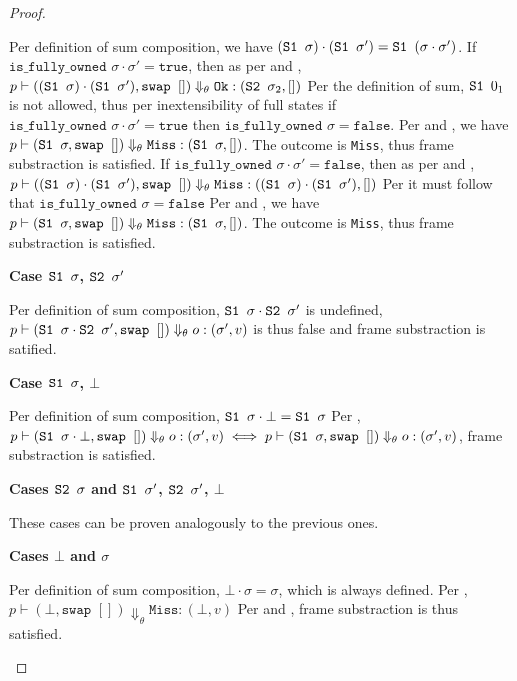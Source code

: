 \documentclass[,a4paper,oneside]{article}
\newcommand{\code}[1]{\texttt{#1}}
\newcommand{\st}[0]{\sigma}
\newcommand{\evalsto}[3]{\ensuremath{p\vdash(#1)\Downarrow_\theta#2:(#3)}}
\newcommand{\Ok}[0]{\code{Ok}}
\newcommand{\Miss}[0]{\code{Miss}}
\begin{document}
\begin{proof}
\begin{description}
	 Per definition of sum composition, we have $(\sone\st)\cdot(\sone\st') = \sone(\st\cdot\st')$.
	 If $\code{is\_fully\_owned } \st\cdot\st' = \code{true}$, then as per  and , ${\evalsto{(\sone\st)\cdot(\sone\st'), \code{swap }[]}{\Ok}{\stwo\st_2,[]}}$
	 Per the definition of sum, $\sone0_1$ is not allowed, thus per inextensibility of full states if ${\code{is\_fully\_owned }\st\cdot\st' = \code{true}}$ then $\code{is\_fully\_owned }\st=\code{false}$.
	 Per  and , we have $\evalsto{\sone\st, \code{swap }[]}{\Miss}{\sone\st, []}$. The outcome is \Miss, thus frame substraction is satisfied.
	 If $\code{is\_fully\_owned } \st\cdot\st' = \code{false}$, then as per  and , \\$\evalsto{(\sone\st)\cdot(\sone\st'), \code{swap }[]}{\Miss}{(\sone\st)\cdot(\sone\st'),[]}$
	 Per  it must follow that $\code{is\_fully\_owned } \st = \code{false}$
	 Per  and , we have $\evalsto{\sone\st, \code{swap }[]}{\Miss}{\sone\st, []}$. The outcome is \Miss, thus frame substraction is satisfied.
\end{description}

\textbf{Case $\sone\st$, $\stwo\st'$}
\begin{description}
	 Per definition of sum composition, $\sone\st \cdot\stwo\st'$ is undefined, $\evalsto{\sone\st \cdot\stwo\st',\code{swap }[]}{o}{\st',v}$ is thus false and frame substraction is satified.
\end{description}

\textbf{Case $\sone\st$, $\bot$}

\begin{description}
	 Per definition of sum composition, $\sone\st \cdot \bot = \sone\st$
	 Per , $\evalsto{\sone\st\cdot\bot,\code{swap }[]}{o}{\st',v} \iff \evalsto{\sone\st,\code{swap }[]}{o}{\st',v}$, frame substraction is satisfied.
\end{description}

\textbf{Cases $\stwo\st$ and $\sone\st'$, $\stwo\st'$, $\bot$}
\begin{description}
	\item These cases can be proven analogously to the previous ones.
\end{description}

\textbf{Cases $\bot$ and $\st$}

\begin{description}
	 Per definition of sum composition, $\bot\cdot\st=\st$, which is always defined.
	 Per , $\evalsto{\bot, \code{swap }[]}{\Miss}{\bot, v}$
	 Per  and , frame substraction is thus satisfied.
\end{description}

\end{proof}
\end{document}
